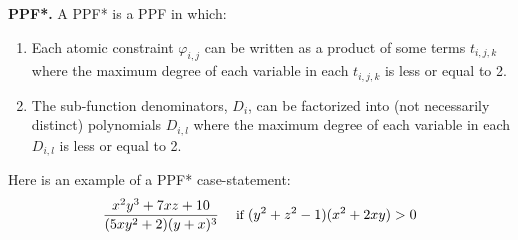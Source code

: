 \documentclass{article} %
\renewcommand{\vec}[1]{\mathbf{#1}}
\newcommand{\singlecase}[2]{#2 \quad \text{ if } #1}
\begin{document}
\textbf{PPF*. }
A PPF* is a PPF in which: %
\vspace{-2mm}
\begin{enumerate}[leftmargin=2.6ex]
\item Each atomic constraint $\varphi_{i,j}$
can be written as a product of some terms $t_{i,j,k}$ where the maximum degree of each variable in each $t_{i,j,k}$ is less or equal to 2. %
\item The sub-function denominators, $D_{i}$, can be factorized into (not necessarily distinct) polynomials ${D}_{i,l}$ where the maximum degree of each variable in each $D_{i,l}$ is less or equal to 2.
\end{enumerate}
\vspace{-2mm}
Here is an example of a PPF* case-statement:
{\footnotesize
\begin{equation}\vspace{-0.5mm}
{\footnotesize
\label{e:ppf*example}
\singlecase{(y^2+z^2 -1)(x^2+2xy) > 0}
{\frac{x^2 y^3 + 7xz + 10}{(5xy^2 + 2)(y + x)^3}}
}
\end{equation}
}
\end{document}
